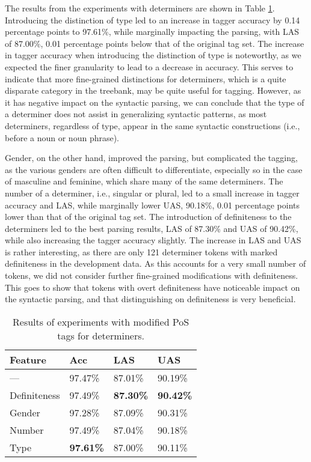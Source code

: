 \documentclass[11pt,a4paper]{article}
\begin{document}
The results from the experiments with determiners are shown in Table
\ref{detresults}.  Introducing the distinction of type led to an increase in
tagger accuracy by 0.14 percentage points to 97.61\%, while marginally
impacting the parsing, with LAS of 87.00\%, 0.01 percentage points below that
of the original tag set.  The increase in tagger accuracy when introducing the
distinction of type is noteworthy, as we expected the finer granularity to lead
to a decrease in accuracy. This serves to indicate that more fine-grained
distinctions for determiners, which is a quite disparate category in the
treebank, may be quite useful for tagging. However, as it has negative impact
on the syntactic parsing, we can conclude that the type of a determiner does
not assist in generalizing syntactic patterns, as most determiners, regardless
of type, appear in the same syntactic constructions (i.e., before a noun or
noun phrase).

Gender, on the other hand, improved the parsing, but complicated the tagging,
as the various genders are often difficult to differentiate, especially so in
the case of masculine and feminine, which share many of the same determiners.
The number of a determiner, i.e., singular or plural, led to a small increase
in tagger accuracy and LAS, while marginally lower UAS, 90.18\%, 0.01
percentage points lower than that of the original tag set. The
introduction of definiteness to the determiners led to the best parsing
results, LAS of 87.30\% and UAS of 90.42\%, while also increasing the tagger
accuracy slightly. The increase in LAS and UAS is rather interesting, as there
are only 121 determiner tokens with marked definiteness in the development
data. As this accounts for a very small number of tokens, we did not consider
further fine-grained modifications with definiteness. This goes to show that
tokens with overt definiteness have noticeable impact on the syntactic parsing,
and that distinguishing on definiteness is very beneficial.

\begin{table}
    \centering
    \smaller[0.5]
    \begin{tabular}{@{}llll@{}}
        \toprule
        \textbf{Feature} & \textbf{Acc} & \textbf{LAS} & \textbf{UAS} \\
        \midrule
        --- & 97.47\% & 87.01\% & 90.19\% \\
        Definiteness & 97.49\% & \textbf{87.30\%} & \textbf{90.42\%} \\
        Gender & 97.28\% & 87.09\% & 90.31\% \\
        Number & 97.49\% & 87.04\% & 90.18\% \\
        Type & \textbf{97.61\%} & 87.00\% & 90.11\% \\
        \bottomrule
    \end{tabular}
    \caption{Results of experiments with modified PoS tags for determiners.}
    \label{detresults}
\end{table}
\end{document}
